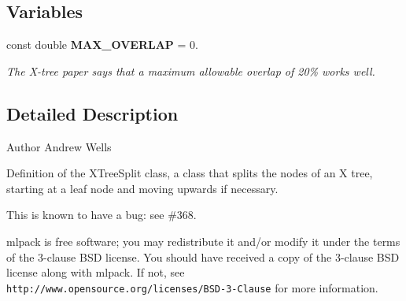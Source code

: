 \subsection*{Variables}
\begin{DoxyCompactItemize}
\item 
const double \textbf{ M\+A\+X\+\_\+\+O\+V\+E\+R\+L\+AP} = 0.
\begin{DoxyCompactList}\small\item\em The X-\/tree paper says that a maximum allowable overlap of 20\% works well. \end{DoxyCompactList}\end{DoxyCompactItemize}


\subsection{Detailed Description}
\begin{DoxyAuthor}{Author}
Andrew Wells
\end{DoxyAuthor}
Definition of the X\+Tree\+Split class, a class that splits the nodes of an X tree, starting at a leaf node and moving upwards if necessary.

This is known to have a bug\+: see \#368.

mlpack is free software; you may redistribute it and/or modify it under the terms of the 3-\/clause B\+SD license. You should have received a copy of the 3-\/clause B\+SD license along with mlpack. If not, see {\tt http\+://www.\+opensource.\+org/licenses/\+B\+S\+D-\/3-\/\+Clause} for more information. 